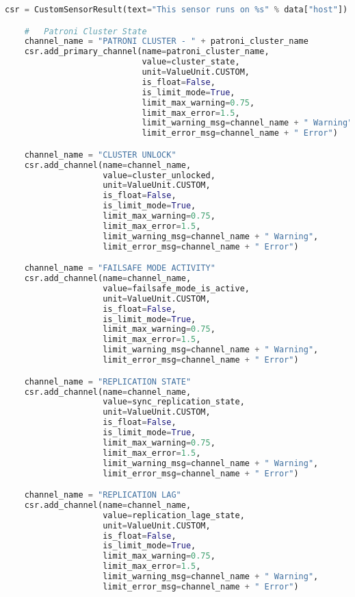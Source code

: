 \begin{flushleft}
\begin{lstlisting}[language=python, caption=Monitoring - KSGR - Patroni - Healthcheck.py,captionpos=b,label={lst:monitoring-python},breaklines=true]
    csr = CustomSensorResult(text="This sensor runs on %s" % data["host"])

    #   Patroni Cluster State
    channel_name = "PATRONI CLUSTER - " + patroni_cluster_name
    csr.add_primary_channel(name=patroni_cluster_name,
                            value=cluster_state,
                            unit=ValueUnit.CUSTOM,
                            is_float=False,
                            is_limit_mode=True,
                            limit_max_warning=0.75,
                            limit_max_error=1.5,
                            limit_warning_msg=channel_name + " Warning",
                            limit_error_msg=channel_name + " Error")

    channel_name = "CLUSTER UNLOCK"
    csr.add_channel(name=channel_name,
                    value=cluster_unlocked,
                    unit=ValueUnit.CUSTOM,
                    is_float=False,
                    is_limit_mode=True,
                    limit_max_warning=0.75,
                    limit_max_error=1.5,
                    limit_warning_msg=channel_name + " Warning",
                    limit_error_msg=channel_name + " Error")

    channel_name = "FAILSAFE MODE ACTIVITY"
    csr.add_channel(name=channel_name,
                    value=failsafe_mode_is_active,
                    unit=ValueUnit.CUSTOM,
                    is_float=False,
                    is_limit_mode=True,
                    limit_max_warning=0.75,
                    limit_max_error=1.5,
                    limit_warning_msg=channel_name + " Warning",
                    limit_error_msg=channel_name + " Error")

    channel_name = "REPLICATION STATE"
    csr.add_channel(name=channel_name,
                    value=sync_replication_state,
                    unit=ValueUnit.CUSTOM,
                    is_float=False,
                    is_limit_mode=True,
                    limit_max_warning=0.75,
                    limit_max_error=1.5,
                    limit_warning_msg=channel_name + " Warning",
                    limit_error_msg=channel_name + " Error")

    channel_name = "REPLICATION LAG"
    csr.add_channel(name=channel_name,
                    value=replication_lage_state,
                    unit=ValueUnit.CUSTOM,
                    is_float=False,
                    is_limit_mode=True,
                    limit_max_warning=0.75,
                    limit_max_error=1.5,
                    limit_warning_msg=channel_name + " Warning",
                    limit_error_msg=channel_name + " Error")


\end{lstlisting}
\end{flushleft}
